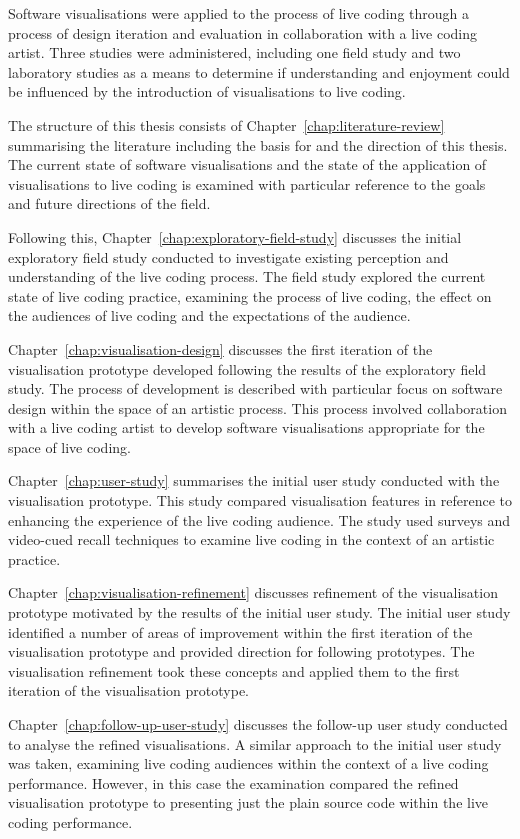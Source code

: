 Software visualisations were applied to the process of live coding through a process of design iteration and evaluation in collaboration with a live coding artist. Three studies were administered, including one field study and two laboratory studies as a means to determine if understanding and enjoyment could be influenced by the introduction of visualisations to live coding.

The structure of this thesis consists of Chapter~\ref{chap:literature-review} summarising the literature including the basis for and the direction of this thesis. The current state of software visualisations and the state of the application of visualisations to live coding is examined with particular reference to the goals and future directions of the field.

Following this, Chapter~\ref{chap:exploratory-field-study} discusses the initial exploratory field study conducted to investigate existing perception and understanding of the live coding process. The field study explored the current state of live coding practice, examining the process of live coding, the effect on the audiences of live coding and the expectations of the audience.

Chapter~\ref{chap:visualisation-design} discusses the first iteration of the visualisation prototype developed following the results of the exploratory field study. The process of development is described with particular focus on software design within the space of an artistic process. This process involved collaboration with a live coding artist to develop software visualisations appropriate for the space of live coding.

Chapter~\ref{chap:user-study} summarises the initial user study conducted with the visualisation prototype. This study compared visualisation features in reference to enhancing the experience of the live coding audience. The study used surveys and video-cued recall techniques to examine live coding in the context of an artistic practice.

Chapter~\ref{chap:visualisation-refinement} discusses refinement of the visualisation prototype motivated by the results of the initial user study. The initial user study identified a number of areas of improvement within the first iteration of the visualisation prototype and provided direction for following prototypes. The visualisation refinement took these concepts and applied them to the first iteration of the visualisation prototype.

Chapter~\ref{chap:follow-up-user-study} discusses the follow-up user study conducted to analyse the refined visualisations. A similar approach to the initial user study was taken, examining live coding audiences within the context of a live coding performance. However, in this case the examination compared the refined visualisation prototype to presenting just the plain source code within the live coding performance.

